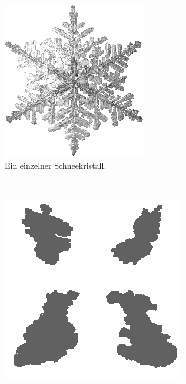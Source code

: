 \begin{figure}
\centering
    \begin{subfigure}[t]{0.45\textwidth}
            \centering
            \includegraphics[width=\textwidth]{images/single_snow_crystal}
            \caption{Ein einzelner  Schneekristall\cite{Yanagi2011}.}
            \label{fig:implementation_single_snow_crystal}
    \end{subfigure}
    ~
    \begin{subfigure}[t]{0.45\textwidth}
            \centering
            \includegraphics[width=\textwidth]{images/real_snowflakes}

\end{subfigure}
\end{figure}
